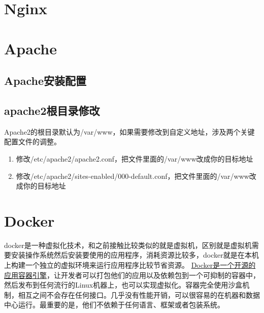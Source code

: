 \section{Nginx}
\section{Apache}
\subsection{Apache安装配置}
\subsection{apache2根目录修改}
Apache2的根目录默认为/var/www，如果需要修改到自定义地址，涉及两个关键配置文件的调整。 
\begin{enumerate}
	\item 修改/etc/apache2/apache2.conf，把文件里面的/var/www改成你的目标地址
	\item 修改/etc/apache2/sites-enabled/000-default.conf，把文件里面的/var/www改成你的目标地址
\end{enumerate}
\section{Docker}
docker是一种虚拟化技术，和之前接触比较类似的就是虚拟机，区别就是虚拟机需要安装操作系统然后安装要使用的应用程序，消耗资源比较多，docker就是在本机上构建一个独立的虚拟环境来运行应用程序比较节省资源。
\href{https://blog.csdn.net/m0_61503020/article/details/125456520?spm=1001.2014.3001.5506}{Docker是一个开源的应用容器引擎}，让开发者可以打包他们的应用以及依赖包到一个可抑制的容器中，然后发布到任何流行的Linux机器上，也可以实现虚拟化。容器完全使用沙盒机制，相互之间不会存在任何接口。几乎没有性能开销，可以很容易的在机器和数据中心运行。最重要的是，他们不依赖于任何语言、框架或者包装系统。
